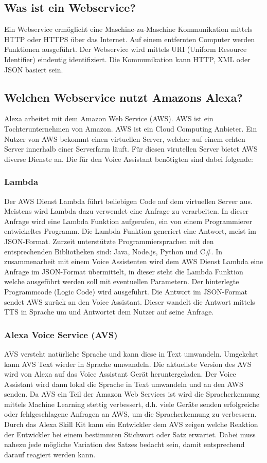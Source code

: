 \subsection{Was ist ein Webservice?}
Ein Webservice erm\"{o}glicht eine Maschine-zu-Maschine Kommunikation mittels
HTTP oder HTTPS \"{u}ber das Internet. Auf einem entfernten Computer werden Funktionen
ausgef\"{u}hrt. Der Webservice wird mittels URI (Uniform Resource Identifier)
eindeutig identifiziert. Die Kommunikation kann HTTP, XML oder JSON basiert sein.

\subsection{Welchen Webservice nutzt Amazons Alexa?}
Alexa arbeitet mit dem Amazon Web Service (AWS). AWS ist ein Tochterunternehmen von Amazon.
AWS ist ein Cloud Computing Anbieter. Ein Nutzer von AWS bekommt einen virtuellen Server, welcher
auf einem echten Server innerhalb einer Serverfarm l\"{a}uft.
F\"{u}r diesen virutellen Server bietet AWS diverse Dienste an.
Die f\"{u}r den Voice Assistant ben\"{o}tigten sind dabei folgende:
\subsubsection{Lambda}
Der AWS Dienst Lambda f\"{u}hrt beliebigen Code auf dem virtuellen Server aus.
Meistens wird Lambda dazu verwendet eine Anfrage zu verarbeiten.
In dieser Anfrage wird eine Lambda Funktion aufgerufen, ein von einem Programmierer
entwickeltes Programm. Die Lambda Funktion generiert eine Antwort, meist im JSON-Format.
Zurzeit unterst\"{u}tzte Programmiersprachen mit den entsprechenden
Bibliotheken sind: Java, Node.js, Python und C\#.
In zusammenarbeit mit einem Voice Assistenten wird dem AWS Dienst Lambda eine Anfrage im
JSON-Format \"{u}bermittelt, in dieser steht die Lambda Funktion welche ausgef\"{u}hrt werden soll
mit eventuellen Parametern. Der hinterlegte Programmcode (Logic Code) wird ausgef\"{u}hrt.
Die Antwort im JSON-Format sendet AWS zur\"{u}ck an den Voice Assistant.
Dieser wandelt die Antwort mittels TTS in Sprache um und Antwortet dem Nutzer auf seine Anfrage.
\subsubsection{Alexa Voice Service (AVS)}
AVS versteht nat\"{u}rliche Sprache und kann diese in Text umwandeln.
Umgekehrt kann AVS Text wieder in Sprache umwandeln.
Die aktuellste Version des AVS wird von Alexa auf das Voice Assistant Ger\"{a}t heruntergeladen.
Der Voice Assistant wird dann lokal die Sprache in Text umwandeln und an den AWS senden.
Da AVS ein Teil der Amazon Web Services ist wird die Spracherkennung mittels Machine Learning
stettig verbessert, d.h. viele Ger\"{a}te senden erfolgreiche oder fehlgeschlagene Anfragen an AWS,
um die Spracherkennung zu verbessern. Durch das Alexa Skill Kit kann ein Entwickler dem AVS
zeigen welche Reaktion der Entwickler bei einem bestimmten Stichwort oder Satz erwartet.
Dabei muss nahezu jede m\"{o}gliche Variation des Satzes bedacht sein, damit entsprechend
darauf reagiert werden kann.

